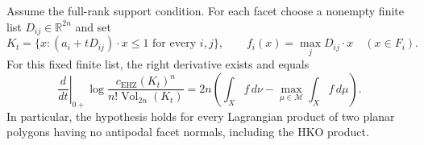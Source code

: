 \begin{theorem}\label{thm:mc-derivative}
Assume the full-rank support condition. For each facet choose a nonempty
finite list $D_{ij}\in\mathbb R^{2n}$ and set
\[
 K_t=\{x:(a_i+tD_{ij})\cdot x\leq1\text{ for every }i,j\},\qquad
 f_i(x)=\max_jD_{ij}\cdot x\quad(x\in F_i).
\]
For this fixed finite list, the right derivative exists and equals
\begin{equation}\label{eq:mc-derivative}
 \left.\frac{d}{dt}\right|_{0+}
 \log\frac{c_{\mathrm{EHZ}}(K_t)^n}{n!\operatorname{Vol}_{2n}(K_t)}
 =2n\left(\int_X f\,d\nu-
                  \max_{\mu\in\mathcal M}\int_X f\,d\mu\right).
\end{equation}
In particular, the hypothesis holds for every Lagrangian product of two
planar polygons having no antipodal facet normals, including the HKO product.
\end{theorem}

